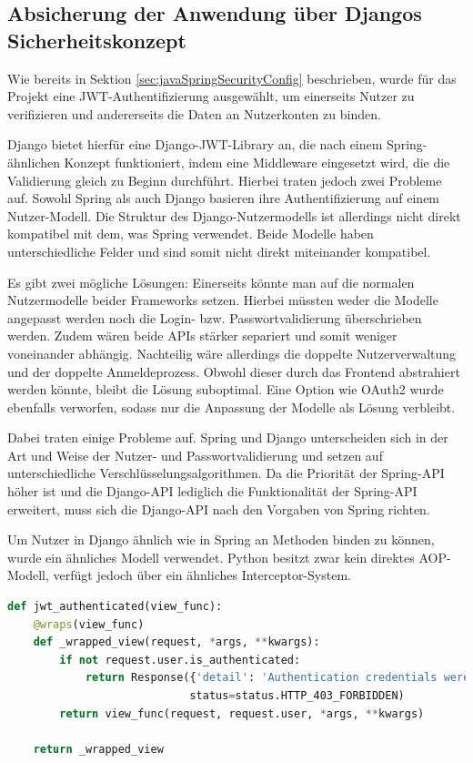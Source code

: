 \subsection{Absicherung der Anwendung über Djangos Sicherheitskonzept}
Wie bereits in Sektion \ref{sec:javaSpringSecurityConfig} beschrieben, wurde für das Projekt eine JWT-Authentifizierung ausgewählt, um einerseits Nutzer zu verifizieren und andererseits die Daten an Nutzerkonten zu binden.

Django bietet hierfür eine Django-JWT-Library an, die nach einem Spring-ähnlichen Konzept funktioniert, indem eine Middleware eingesetzt wird, die die Validierung gleich zu Beginn durchführt. Hierbei traten jedoch zwei Probleme auf. 
Sowohl Spring als auch Django basieren ihre Authentifizierung auf einem Nutzer-Modell. Die Struktur des Django-Nutzermodells ist allerdings nicht direkt kompatibel mit dem, was Spring verwendet. 
Beide Modelle haben unterschiedliche Felder und sind somit nicht direkt miteinander kompatibel.

Es gibt zwei mögliche Lösungen: Einerseits könnte man auf die normalen Nutzermodelle beider Frameworks setzen. Hierbei müssten weder die Modelle angepasst werden noch die Login- bzw. Passwortvalidierung überschrieben werden. 
Zudem wären beide APIs stärker separiert und somit weniger voneinander abhängig. Nachteilig wäre allerdings die doppelte Nutzerverwaltung und der doppelte Anmeldeprozess. Obwohl dieser durch das Frontend abstrahiert werden könnte, 
bleibt die Lösung suboptimal. Eine Option wie OAuth2 wurde ebenfalls verworfen, sodass nur die Anpassung der Modelle als Lösung verbleibt.

Dabei traten einige Probleme auf. Spring und Django unterscheiden sich in der Art und Weise der Nutzer- und Passwortvalidierung und setzen auf unterschiedliche Verschlüsselungsalgorithmen. Da die Priorität der Spring-API höher ist und die Django-API lediglich die Funktionalität der Spring-API erweitert, muss sich die Django-API nach den Vorgaben von Spring richten.

Um Nutzer in Django ähnlich wie in Spring an Methoden binden zu können, wurde ein ähnliches Modell verwendet. Python besitzt zwar kein direktes AOP-Modell, verfügt jedoch über ein ähnliches Interceptor-System.

\begin{lstlisting}[language=Python, caption={Annotation basiertes Anbinden eines Nutzermodelles an eine Methode}, label={code:djangoSecurity}]
def jwt_authenticated(view_func):
    @wraps(view_func)
    def _wrapped_view(request, *args, **kwargs):
        if not request.user.is_authenticated:
            return Response({'detail': 'Authentication credentials were not provided.'},
                            status=status.HTTP_403_FORBIDDEN)
        return view_func(request, request.user, *args, **kwargs)

    return _wrapped_view
\end{lstlisting}

